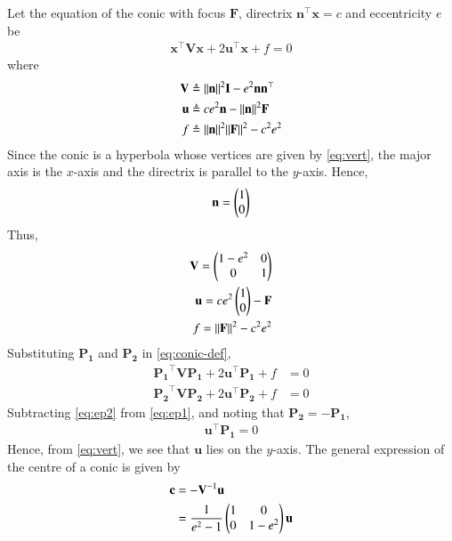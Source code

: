 \documentclass[journal,12pt,twocolumn]{IEEEtran}
\renewcommand{\vec}[1]{\boldsymbol{\mathbf{#1}}}
\begin{document}
\begin{enumerate}
    \solution Let the equation of the conic with focus $\vec{F}$, directrix
    $\vec{n}^\top\vec{x} = c$ and eccentricity $e$ be
    \begin{align}
        \vec{x}^\top\vec{V}\vec{x} + 2\vec{u}^\top\vec{x} + f = 0
        \label{eq:conic-def}
    \end{align}
    where
    \begin{align}
        \vec{V} &\triangleq \norm{\vec{n}}^2\vec{I} - e^2\vec{n}\vec{n}^\top \label{eq:V-def} \\
        \vec{u} &\triangleq ce^2\vec{n} - \norm{\vec{n}}^2\vec{F} \label{eq:u-def} \\
        f &\triangleq \norm{\vec{n}}^2\norm{\vec{F}}^2 - c^2e^2 \label{eq:f-def}
    \end{align}
    Since the conic is a hyperbola whose vertices are given by \eqref{eq:vert},
    the major axis is the $x$-axis and the directrix is parallel to the $y$-axis.
    Hence,
    \begin{align}
        \vec{n} = \myvec{1\\0}
    \end{align}
    Thus,
    \begin{align}
        \vec{V} = \myvec{1-e^2&0\\0&1} \label{eq:V-val} \\
        \vec{u} = ce^2\myvec{1\\0} - \vec{F} \label{eq:u-val} \\
        f = \norm{\vec{F}}^2 - c^2e^2 \label{eq:f-val}
    \end{align}
    Substituting $\vec{P_1}$ and $\vec{P_2}$ in \eqref{eq:conic-def},
    \begin{align}
        \vec{P_1}^\top\vec{VP_1} + 2\vec{u}^\top\vec{P_1} + f &= 0 \label{eq:ep1} \\
        \vec{P_2}^\top\vec{VP_2} + 2\vec{u}^\top\vec{P_2} + f &= 0 \label{eq:ep2}
    \end{align}
    Subtracting \eqref{eq:ep2} from \eqref{eq:ep1}, and noting that $\vec{P_2} = -\vec{P_1}$,
    \begin{align}
        \vec{u}^\top\vec{P_1} = 0
        \label{eq:u-exp}
    \end{align}
    Hence, from \eqref{eq:vert}, we see that $\vec{u}$ lies on the $y$-axis.
    The general expression of the centre of a conic is given by
    \begin{align}
        \vec{c} &= -\vec{V}^{-1}\vec{u} \\
                &= \frac{1}{e^2-1}\myvec{1&0\\0&1-e^2}\vec{u}

\end{align}
\end{enumerate}
\end{document}
